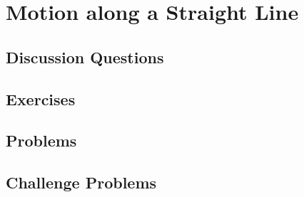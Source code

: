 
\chapter{Motion along a Straight Line}

\section{Discussion Questions}

\section{Exercises}

\section{Problems}

\section{Challenge Problems}
